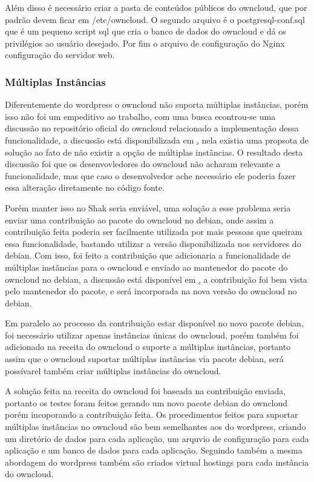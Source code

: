 Além disso é necessário criar a pasta de conteúdos públicos do owncloud, que por
padrão devem ficar em /etc/owncloud. O segundo arquivo é o postgresql-conf.sql
que é um pequeno script sql que cria o banco de dados do owncloud e dá os
privilégios ao usuário desejado. Por fim o arquivo de configuração do Nginx
configuração do servidor web.

\subsubsection{Múltiplas Instâncias}

Diferentemente do wordpress o owncloud não suporta múltiplas instâncias, porém isso
não foi um empeditivo ao trabalho, com uma busca econtrou-se uma discussão no repositório
oficial do owncloud relacionado a implementação dessa funcionalidade, a discussão está
disponibilizada em \href{https://github.com/owncloud/core/pull/16424}, nela existia
uma propsota de solução ao fato de não existir a opção de múltiplas instâncias. O
resultado desta discussão foi que os desenvovledores do owncloud não acharam relevante
a funcionalidade, mas que caso o desenvolvedor ache necessário ele poderia fazer essa
alteração diretamente no código fonte.

Porém manter isso no Shak seria enviável, uma solução a esse problema seria enviar
uma contribuição ao pacote do owncloud no debian, onde assim a contribuição feita
poderia ser facilmente utilizada por mais pessoas que queiram essa funcionalidade,
bastando utilizar a versão disponibilizada nos servidores do debian. Com isso, foi
feito a contribuição que adicionaria a funcionalidade de múltiplas instâncias para
o owncloud e enviado ao mantenedor do pacote do owncloud no debian,
a discussão está disponível em \href{https://bugs.debian.org/cgi-bin/bugreport.cgi?bug=789726},
a contribuição foi bem vista pelo mantenedor do pacote, e será incorporada na nova
versão do owncloud no debian.

Em paralelo ao processo da contribuição estar disponível no novo pacote debian,
foi necessário utilizar apenas instâncias únicas do owncloud, porém também foi
adicionado na receita do owncloud o suporte a múltiplas instâncias, portanto
assim que o owncloud suportar múltiplas instâncias via pacote debian, será possívarel
também criar múltiplas instâncias do owncloud.

A solução feita na receita do owncloud foi baseada na contribuição enviada, portanto
os testes foram feitos gerando um novo pacote debian do owncloud porém incoporando
a contribuição feita. Os procedimentos feitos para suportar múltiplas instâncias
no owncloud são bem semelhantes aos do wordpress, criando um diretório de dados
para cada aplicação, um arquvio de configuração para cada aplicação e um banco de
dados para cada aplicação. Seguindo também a mesma abordagem do wordpress também
são criados virtual hostings para cada instância do owncloud.

